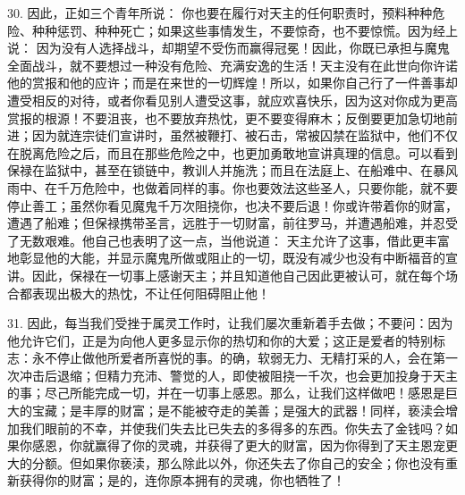 30. 因此，正如三个青年所说： 你也要在履行对天主的任何职责时，预料种种危险、种种惩罚、种种死亡；如果这些事情发生，不要惊奇，也不要惊慌。因为经上说： 因为没有人选择战斗，却期望不受伤而赢得冠冕！因此，你既已承担与魔鬼全面战斗，就不要想过一种没有危险、充满安逸的生活！天主没有在此世向你许诺他的赏报和他的应许；而是在来世的一切辉煌！所以，如果你自己行了一件善事却遭受相反的对待，或者你看见别人遭受这事，就应欢喜快乐，因为这对你成为更高赏报的根源！不要沮丧，也不要放弃热忱，更不要变得麻木；反倒要更加急切地前进；因为就连宗徒们宣讲时，虽然被鞭打、被石击，常被囚禁在监狱中，他们不仅在脱离危险之后，而且在那些危险之中，也更加勇敢地宣讲真理的信息。可以看到保禄在监狱中，甚至在锁链中，教训人并施洗；而且在法庭上、在船难中、在暴风雨中、在千万危险中，也做着同样的事。你也要效法这些圣人，只要你能，就不要停止善工；虽然你看见魔鬼千万次阻挠你，也决不要后退！你或许带着你的财富，遭遇了船难；但保禄携带圣言，远胜于一切财富，前往罗马，并遭遇船难，并忍受了无数艰难。他自己也表明了这一点，当他说道： 天主允许了这事，借此更丰富地彰显他的大能，并显示魔鬼所做或阻止的一切，既没有减少也没有中断福音的宣讲。因此，保禄在一切事上感谢天主；并且知道他自己因此更被认可，就在每个场合都表现出极大的热忱，不让任何阻碍阻止他！\par

31. 因此，每当我们受挫于属灵工作时，让我们屡次重新着手去做；不要问：因为他允许它们，正是为向他人更多显示你的热切和你的大爱；这正是爱者的特别标志：永不停止做他所爱者所喜悦的事。的确，软弱无力、无精打采的人，会在第一次冲击后退缩；但精力充沛、警觉的人，即使被阻挠一千次，也会更加投身于天主的事；尽己所能完成一切，并在一切事上感恩。那么，让我们这样做吧！感恩是巨大的宝藏；是丰厚的财富；是不能被夺走的美善；是强大的武器！同样，亵渎会增加我们眼前的不幸，并使我们失去比已失去的多得多的东西。你失去了金钱吗？如果你感恩，你就赢得了你的灵魂，并获得了更大的财富，因为你得到了天主恩宠更大的分额。但如果你亵渎，那么除此以外，你还失去了你自己的安全；你也没有重新获得你的财富；是的，连你原本拥有的灵魂，你也牺牲了！\par

